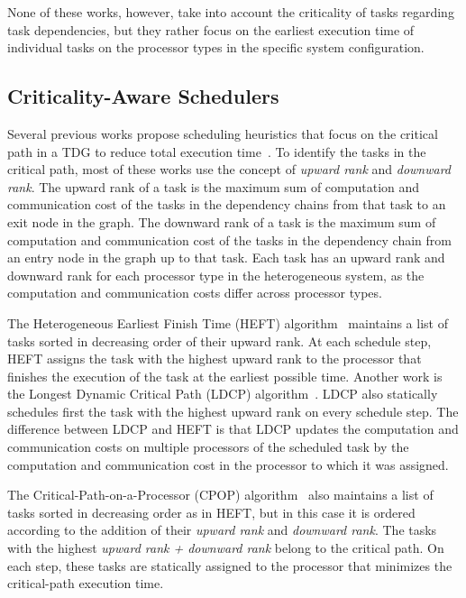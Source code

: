 None of these works, however, take into account the criticality of tasks regarding task dependencies, but they rather focus on the earliest execution time of individual tasks on the processor types in the specific system configuration.

\subsection{Criticality-Aware Schedulers}
\label{sec.relwork_critical}

Several previous works propose scheduling heuristics that focus on the critical path in a TDG to reduce total execution time~\cite{DCPS, LDCP, HEFT, CrPathDup}. To identify the tasks in the critical path, most of these works use the concept of \textit{upward rank} and \textit{downward rank}. The upward rank of a task is the maximum sum of computation and communication cost of the tasks in the dependency chains from that task to an exit node in the graph. The downward rank of a task is the maximum sum of computation and communication cost of the tasks in the dependency chain from an entry node in the graph up to that task. Each task has an upward rank and downward rank for each processor type in the heterogeneous system, as the computation and communication costs differ across processor types.

The Heterogeneous Earliest Finish Time (HEFT) algorithm~\cite{HEFT} maintains a list of tasks sorted in decreasing order of their upward rank. At each schedule step, HEFT assigns the task with the highest upward rank to the processor that finishes the execution of the task at the earliest possible time. Another work is the Longest Dynamic Critical Path (LDCP) algorithm~\cite{LDCP}. LDCP also statically schedules first the task with the highest upward rank on every schedule step. The difference between LDCP and HEFT is that LDCP updates the computation and communication costs on multiple processors of the scheduled task by the computation and communication cost in the processor to which it was assigned.

The Critical-Path-on-a-Processor (CPOP) algorithm~\cite{HEFT} also maintains a list of tasks sorted in decreasing order as in HEFT, but in this case it is ordered according to the addition of their \textit{upward rank} and \textit{downward rank}. The tasks with the highest \textit{upward rank + downward rank} belong to the critical path. On each step, these tasks are statically assigned to the processor that minimizes the critical-path execution time.

